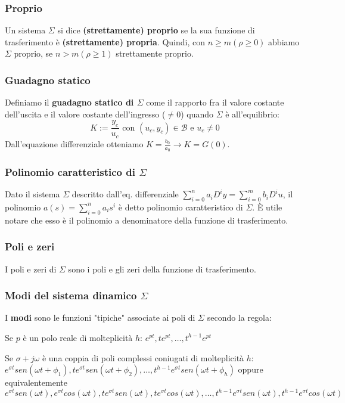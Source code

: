 \documentclass[11pt]{article}
\begin{document}
\subsubsection{Proprio}
Un sistema $\Sigma$ si dice \textbf{(strettamente) proprio} se la sua funzione di trasferimento è \textbf{(strettamente) propria}. Quindi, con $n\ge m (\rho \ge 0)$ abbiamo $\Sigma$ proprio, se $n>m (\rho\ge1)$ strettamente proprio.
\subsubsection{Guadagno statico}
Definiamo il \textbf{guadagno statico di $\Sigma$} come il rapporto fra il valore costante dell'uscita e il valore costante dell'ingresso ($\neq 0$) quando $\Sigma$ è all'equilibrio:
\begin{displaymath}
    K := \frac{y_c}{u_c} \textrm{ con } (u_c, y_c) \in \mathcal{B} \textrm{ e }u_c \neq 0
\end{displaymath}
Dall'equazione differenziale otteniamo $K=\frac{b_0}{a_0} \rightarrow K=G(0)$.
\subsubsection{Polinomio caratteristico di $\Sigma$}
Dato il sistema $\Sigma$ descritto dall'eq. differenziale $\sum_{i=0}^n a_i D^i y = \sum_{i=0}^m b_i D^i u$, il polinomio $a(s)= \sum_{i=0}^n a_i s^i$ è detto polinomio caratteristico di $\Sigma$. È utile notare che esso è il polinomio a denominatore della funzione di trasferimento.
\subsubsection{Poli e zeri}
I poli e zeri di $\Sigma$ sono i poli e gli zeri della funzione di trasferimento. 
\subsubsection{Modi del sistema dinamico $\Sigma$}
I \textbf{modi} sono le funzioni  "tipiche" associate ai poli di $\Sigma$ secondo la regola:
\begin{center}
    Se $p$ è un polo reale di molteplicità $h$: $e^{pt}, te^{pt},\dots, t^{h-1}e^{pt}$
\end{center}
\begin{center}
    Se $\sigma+j\omega$ è una coppia di poli complessi coniugati di molteplicità $h$: $e^{\sigma t} sen(\omega t+\phi_1), te^{\sigma t} sen(\omega t+\phi_2),\dots, t^{h-1}e^{\sigma t} sen(\omega t+\phi_h)$ oppure equivalentemente $e^{\sigma t} sen(\omega t), e^{\sigma t} cos(\omega t), te^{\sigma t} sen(\omega t), te^{\sigma t} cos(\omega t),\dots, t^{h-1}e^{\sigma t} sen(\omega t), t^{h-1} e^{\sigma t} cos(\omega t)$
\end{center}
\end{document}
